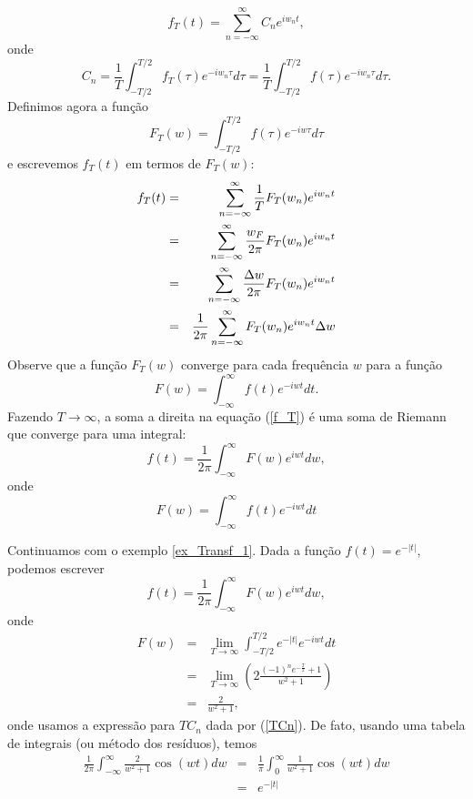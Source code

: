 \begin{equation}
f_T(t)=\sum_{n=-\infty}^\infty C_n e^{i w_n t},
\end{equation}
onde 
\begin{equation}C_n=\frac{1}{T}\int_{-T/2}^{T/2}f_T(\tau)e^{-iw_n \tau}d\tau=\frac{1}{T}\int_{-T/2}^{T/2}f(\tau)e^{-iw_n \tau}d\tau.\end{equation}
Definimos agora a função \begin{equation}F_T(w)=\int_{-T/2}^{T/2}f(\tau)e^{-iw \tau}d\tau\end{equation} e escrevemos $f_T(t)$ em termos de $F_T(w)$:
\begin{eqnarray}
\nonumber f_T(t)&=&\sum_{n=-\infty}^\infty \frac{1}{T}F_T(w_n) e^{i w_n t}\\&=& \sum_{n=-\infty}^\infty \frac{w_F}{2\pi}F_T(w_n) e^{i w_n t}
\\\nonumber &=& \sum_{n=-\infty}^\infty \frac{\Delta w}{2\pi}F_T(w_n) e^{i w_n t}
\\{\label{f_T}}&=&\frac{1}{2\pi} \sum_{n=-\infty}^\infty F_T(w_n) e^{i w_n t}\Delta w
\end{eqnarray}
Observe que a função $F_T(w)$ converge para cada frequência $w$ para a função 
\begin{equation}
F(w)=\int_{-\infty}^\infty f(t) e^{-iw t}dt.
\end{equation}
Fazendo $T\to \infty$, a soma a direita na equação (\ref{f_T}) é uma soma de Riemann que converge para uma integral:
\begin{equation}
f(t)=\frac{1}{2\pi} \int_{-\infty}^\infty F(w)e^{iw t}dw,
\end{equation}
onde
\begin{equation}F(w)=\int_{-\infty}^{\infty}f(t)e^{-i w t}dt\end{equation}
\begin{ex} Continuamos com o exemplo \ref{ex_Transf_1}. Dada a função $f(t)=e^{-|t|}$, podemos escrever
\begin{equation}
f(t)=\frac{1}{2\pi} \int_{-\infty}^\infty F(w)e^{iw t}dw,
\end{equation}
onde
\begin{eqnarray*}
F(w)&=&\lim_{T\to\infty}\int_{-T/2}^{T/2}e^{-|t|} e^{-i w t}dt\\
&=&\lim_{T\to\infty}\left(2\frac{ (-1)^ne^{-\frac{T}{2}}+1}{w^2+1} \right)\\
&=&\frac{2}{w^2+1},
\end{eqnarray*}
onde usamos a expressão para $TC_n$ dada por (\ref{TCn}). De fato, usando uma tabela de integrais (ou método dos resíduos), temos
\begin{eqnarray}
\frac{1}{2\pi} \int_{-\infty}^\infty \frac{2}{w^2+1} \cos(wt)dw
&=&\frac{1}{\pi} \int_{0}^\infty \frac{1}{w^2+1} \cos(wt)dw\\
&=&e^{-|t|}
\end{eqnarray}
\end{ex}
